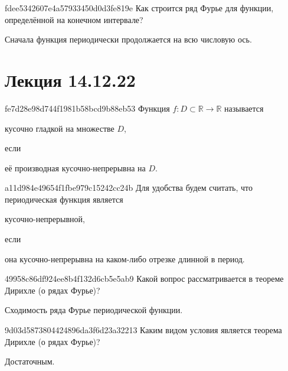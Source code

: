 \begin{note}{fdee5342607e4a57933450d0d3fe819e}
    Как строится ряд Фурье для функции, определённой на конечном интервале?

    \begin{cloze}{1}
        Сначала функция периодически продолжается на всю числовую ось.
    \end{cloze}
\end{note}

\section{Лекция 14.12.22}
\begin{note}{fe7d28e98d744f1981b58bcd9b88eb53}
    Функция \({ f : D \subset \mathbb R \to \mathbb R }\) называется \begin{icloze}{2}кусочно гладкой на множестве \({ D }\),\end{icloze} если \begin{icloze}{1}её производная кусочно-непрерывна на \({ D }\).\end{icloze}
\end{note}

\begin{note}{a11d984e49654f1fbe979c15242cc24b}
    Для удобства будем считать, что периодическая функция является \begin{icloze}{2}кусочно-не\-пре\-рыв\-ной,\end{icloze} если \begin{icloze}{1}она кусочно-не\-пре\-рыв\-на на каком-либо отрезке длинной в период.\end{icloze}
\end{note}

\begin{note}{49958c86df924ee8b4f132d6cb5e5ab9}
    Какой вопрос рассматривается в теореме Дирихле (о рядах Фурье)?

    \begin{cloze}{1}
        Сходимость ряда Фурье периодической функции.
    \end{cloze}
\end{note}

\begin{note}{9d03d5873804424896da3f6d23a32213}
    Каким видом условия является теорема Дирихле (о рядах Фурье)?

    \begin{cloze}{1}
        Достаточным.
    \end{cloze}
\end{note}


